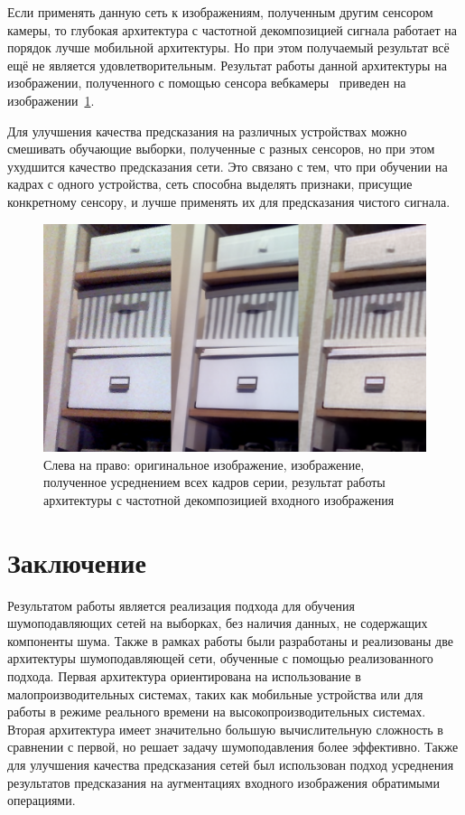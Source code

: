 \documentclass[14pt]{mmcs_article}
\begin{document}
Если применять данную сеть к изображениям, полученным другим сенсором камеры, то глубокая архитектура с частотной декомпозицией сигнала работает на порядок лучше мобильной архитектуры. Но при этом получаемый результат всё ещё не является удовлетворительным. Результат работы данной архитектуры на изображении, полученного с помощью сенсора вебкамеры~\autocite{WebCam} приведен на изображении~\ref{fig:real_noise_webacam_advanced}.

Для улучшения качества предсказания на различных устройствах можно смешивать обучающие выборки, полученные с разных сенсоров, но при этом ухудшится качество предсказания сети. Это связано с тем, что при обучении на кадрах с одного устройства, сеть способна выделять признаки, присущие конкретному сенсору, и лучше применять их для предсказания чистого сигнала.

\begin{figure}[H]
	\centering
	\includegraphics[width=\textwidth]{img/real_noise_webacam_advanced}
	\caption{Слева на право: оригинальное изображение, изображение, полученное усреднением всех кадров серии, результат работы архитектуры с частотной декомпозицией входного изображения}
	\label{fig:real_noise_webacam_advanced}
\end{figure}


\newpage
{}
\section*{Заключение}

Результатом работы является реализация подхода для обучения шумоподавляющих сетей на выборках, без наличия данных, не содержащих компоненты шума. Также в рамках работы были разработаны и реализованы две архитектуры шумоподавляющей сети, обученные с помощью реализованного подхода. Первая архитектура ориентирована на использование в малопроизводительных системах, таких как мобильные устройства или для работы в режиме реального времени на высокопроизводительных системах. Вторая архитектура имеет значительно большую вычислительную сложность в сравнении с первой, но решает задачу шумоподавления более эффективно. Также для улучшения качества предсказания сетей был использован подход усреднения результатов предсказания на аугментациях входного изображения обратимыми операциями.
\end{document}
